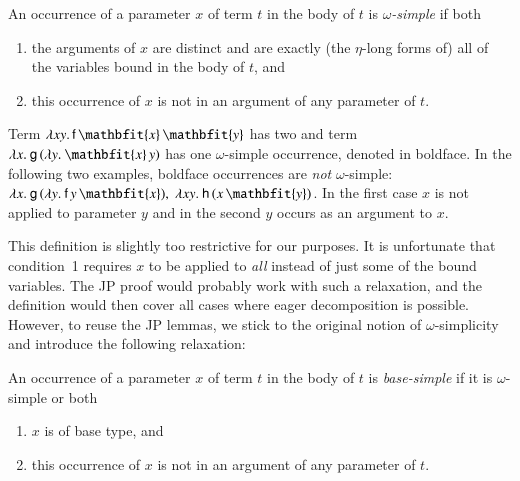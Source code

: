   \begin{defi}
  [$\jp D2$]\label{unif:def:omega-simple}An occurrence of a parameter $x$ of term $t$
  in the body of $t$ is $\omega$\emph{-simple }if both
  \begin{enumerate}
  \item the arguments of $x$ are distinct and are exactly (the $\eta$-long
  forms of) all of the variables bound in the body of $t$, and
  \item this occurrence of $x$ is not in an argument of any parameter
  of $t$.
  \end{enumerate}
  \end{defi}
  
  \begin{exa}[JP E1]
    Term
    $\lambda xy. \, \cst{f} \, \mathbfit{x} \, \mathbfit{y}$ has two and term
    $\lamx{\cst{g} \, (\lam{y}{\mathbfit{x}\, y})}$ has one $\omega$-simple
    occurrence, denoted in boldface. In the following two examples, boldface
    occurrences are \emph{not} $\omega$-simple: $\lamx{\cst{g} \,
    (\lam{y}{\cst{f} \, y \, \mathbfit{x}})},\; \lam{xy}{\cst{h} \, (x \,
    \mathbfit{y})}$. In the first case $x$ is not applied to parameter $y$ and
    in the second $y$ occurs as an argument to $x$. 
  \end{exa}
  This definition is slightly too restrictive for our purposes.
  It is unfortunate that condition~1 requires $x$ to be applied to
  \emph{all} instead of just some of the bound variables. The JP
  proof would probably work with such a relaxation, and the definition
  would then cover all cases where eager decomposition is possible. 
  However, to reuse the JP lemmas, we stick to the original
  notion of $\omega$-simplicity and introduce the following relaxation:
  \begin{defi}
  An occurrence of a parameter $x$ of term $t$ in the body of $t$
  is \emph{base-simple} if it is $\omega$-simple or both
  \begin{enumerate}
  \item $x$ is of base type, and
  \item this occurrence of $x$ is not in an argument of any parameter
  of $t$.
  \end{enumerate}
  \end{defi}

